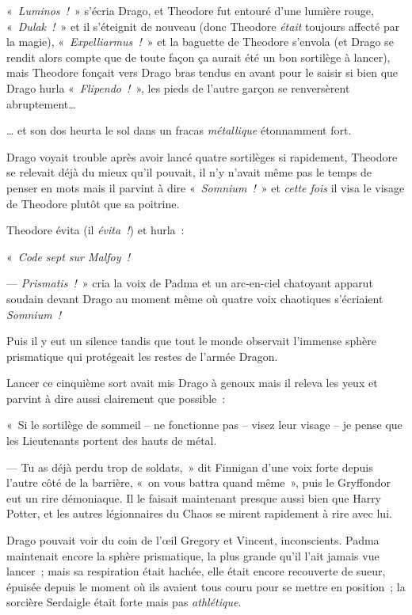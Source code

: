 «~\emph{Luminos~!}~» s'écria Drago, et Theodore fut entouré d'une lumière rouge, «~\emph{Dulak~!}~» et il s'éteignit de nouveau (donc Theodore \emph{était} toujours affecté par la magie), «~\emph{Expelliarmus~!}~» et la baguette de Theodore s'envola (et Drago se rendit alors compte que de toute façon ça aurait été un bon sortilège à lancer), mais Theodore fonçait vers Drago bras tendus en avant pour le saisir si bien que Drago hurla «~\emph{Flipendo~!}~», les pieds de l'autre garçon se renversèrent abruptement…

… et son dos heurta le sol dans un fracas \emph{métallique} étonnamment fort.

Drago voyait trouble après avoir lancé quatre sortilèges si rapidement, Theodore se relevait déjà du mieux qu'il pouvait, il n'y n'avait même pas le temps de penser en mots mais il parvint à dire «~\emph{Somnium~!}~» et \emph{cette fois} il visa le visage de Theodore plutôt que sa poitrine.

Theodore évita (il \emph{évita~!}) et hurla~:

«~\emph{Code sept sur Malfoy~!}

--- \emph{Prismatis~!}~» cria la voix de Padma et un arc-en-ciel chatoyant apparut soudain devant Drago au moment même où quatre voix chaotiques s'écriaient \emph{Somnium~!}

Puis il y eut un silence tandis que tout le monde observait l'immense sphère prismatique qui protégeait les restes de l'armée Dragon.

Lancer ce cinquième sort avait mis Drago à genoux mais il releva les yeux et parvint à dire aussi clairement que possible~:

«~Si le sortilège de sommeil -- ne fonctionne pas -- visez leur visage -- je pense que les Lieutenants portent des hauts de métal.

--- Tu as déjà perdu trop de soldats,~» dit Finnigan d'une voix forte depuis l'autre côté de la barrière, «~on vous battra quand même~», puis le Gryffondor eut un rire démoniaque. Il le faisait maintenant presque aussi bien que Harry Potter, et les autres légionnaires du Chaos se mirent rapidement à rire avec lui.

Drago pouvait voir du coin de l'œil Gregory et Vincent, inconscients. Padma maintenait encore la sphère prismatique, la plus grande qu'il l'ait jamais vue lancer~; mais sa respiration était hachée, elle était encore recouverte de sueur, épuisée depuis le moment où ils avaient tous couru pour se mettre en position~; la sorcière Serdaigle était forte mais pas \emph{athlétique}.

